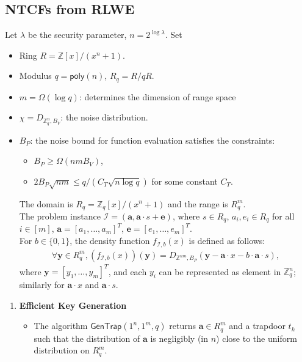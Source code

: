 \documentclass[cryptography,review,submit,pdftex,moreauthors,amsmath,amssymb,aps,strict]{Definitions/mdpi}
\begin{document}
\subsection[\appendixname~\thesubsection]{NTCFs from RLWE}
\begin{Definition} Let $\lambda$ be the security parameter, $n=2^{\log \lambda}$. Set
\begin{itemize}
    \item Ring $R=\mathbb{Z}[x]/(x^n+1)$.
    \item Modulus $q=\mathsf{poly}(n)$, $R_q=R/qR$.
    \item $m=\Omega(\log q)$: determines the dimension of range space
    \item $\chi = D_{\mathbb{Z}^n_q,B_V}$: the noise distribution.
    \item $B_P$: the noise bound for function evaluation satisfies the constraints:
    \begin{itemize}
        \item $B_P\geq \Omega(nmB_V)$,
        \item $2B_P\sqrt{nm}\leq q/(C_T\sqrt{n\log q})$ for some constant $C_T$.
    \end{itemize}
    The domain is $R_q=\mathbb{Z}_q[x]/(x^n+1)$ and the range is $R_q^{m}$.\\
    The problem instance $\mathcal{I}=(\mathbf{a},\mathbf{a}\cdot s+\mathbf{e})$, where $s\in R_q$, $a_i,e_i\in R_q$ for all $i\in[m]$, $\mathbf{a}=[a_1,\dots,a_m]^T$, $\mathbf{e}=[e_1,\dots,e_m]^T$.\\
    For $b\in\{0,1\}$, the density function $f_{\mathcal{I},b}(x)$ is defined as follows:
    \begin{align}
        \forall \mathbf{y}\in R_q^m, (f_{\mathcal{I},b}(x))(\mathbf{y})=D_{\mathbb{Z}^{nm},B_P}(\mathbf{y}-\mathbf{a}\cdot x - b\cdot \mathbf{a}\cdot s),
    \end{align}
    where $\mathbf{y}=[y_1,\dots,y_m]^T$, and each $y_i$ can be represented as element in $\mathbb{Z}^n_q$; similarly for $\mathbf{a}\cdot x$ and $\mathbf{a}\cdot s$.
\end{itemize}
\begin{enumerate}
    \item \textbf{Efficient Key Generation} 
        \begin{itemize}
            \item The algorithm $\mathsf{GenTrap}(1^n,1^m,q)$ returns $\mathbf{a}\in R^m_q$ and a trapdoor $t_{k}$ such that the distribution of $\mathbf{a}$ is negligibly (in $n$) close to the uniform distribution on $R^m_q$.

\end{itemize}
\end{enumerate}
\end{Definition}
\end{document}
